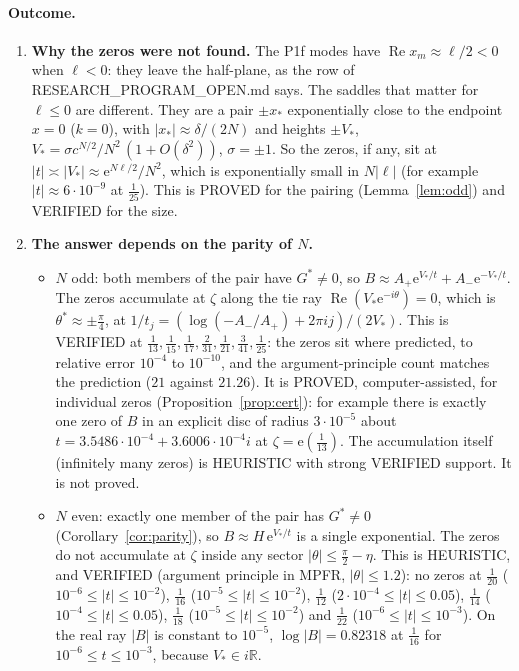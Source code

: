 \documentclass[11pt]{article}
\theoremstyle{remark}\newtheorem{remark}[theorem]{Remark}
\newcommand{\e}{\mathrm{e}}
\begin{document}
\paragraph{Outcome.}
\begin{enumerate}
\item[(A)] \textbf{Why the zeros were not found.} The P1f modes have $\operatorname{Re}x_m\approx\ell/2<0$ when $\ell<0$: they leave the
half-plane, as the row of RESEARCH\_PROGRAM\_OPEN.md says. The saddles that matter for $\ell\le0$ are different. They are
a pair $\pm x_*$ exponentially close to the endpoint $x=0$ ($k=0$), with $|x_*|\approx\delta/(2N)$ and heights
$\pm V_*$, $V_*=\sigma c^{N/2}/N^2\,(1+O(\delta^2))$, $\sigma=\pm1$. So the zeros, if any, sit at $|t|\asymp|V_*|\approx\e^{N\ell/2}/N^2$,
which is exponentially small in $N|\ell|$ (for example $|t|\approx6\cdot10^{-9}$ at $\frac1{25}$). This is PROVED for the pairing (Lemma~\ref{lem:odd})
and VERIFIED for the size.
\item[(B)] \textbf{The answer depends on the parity of $N$.}
\begin{itemize}
\item $N$ odd: both members of the pair have $G^*\ne0$, so $B\approx A_+\e^{V_*/t}+A_-\e^{-V_*/t}$. The zeros accumulate at $\zeta$ along
the tie ray $\operatorname{Re}(V_*\e^{-i\theta})=0$, which is $\theta^*\approx\pm\frac\pi4$, at $1/t_j=(\log(-A_-/A_+)+2\pi ij)/(2V_*)$.
This is VERIFIED at $\frac1{13},\frac1{15},\frac1{17},\frac2{31},\frac1{21},\frac3{41},\frac1{25}$: the zeros sit where predicted, to relative
error $10^{-4}$ to $10^{-10}$, and the argument-principle count matches the prediction ($21$ against $21.26$). It is PROVED,
computer-assisted, for individual zeros (Proposition~\ref{prop:cert}): for example there is exactly one zero of $B$ in an explicit disc
of radius $3\cdot10^{-5}$ about $t=3.5486\cdot10^{-4}+3.6006\cdot10^{-4}i$ at $\zeta=\e(\frac1{13})$. The accumulation itself
(infinitely many zeros) is HEURISTIC with strong VERIFIED support. It is not proved.
\item $N$ even: exactly one member of the pair has $G^*\ne0$ (Corollary~\ref{cor:parity}), so $B\approx H\,\e^{V_*/t}$ is a single exponential.
The zeros do not accumulate at $\zeta$ inside any sector $|\theta|\le\frac\pi2-\eta$. This is HEURISTIC, and VERIFIED
(argument principle in MPFR, $|\theta|\le1.2$): no zeros at $\frac1{20}$ ($10^{-6}\le|t|\le10^{-2}$), $\frac1{16}$ ($10^{-5}\le|t|\le10^{-2}$),
$\frac1{12}$ ($2\cdot10^{-4}\le|t|\le0.05$), $\frac1{14}$ ($10^{-4}\le|t|\le0.05$), $\frac1{18}$ ($10^{-5}\le|t|\le10^{-2}$) and $\frac1{22}$ ($10^{-6}\le|t|\le10^{-3}$). On the real ray $|B|$ is constant to $10^{-5}$, $\log|B|=0.82318$ at $\frac1{16}$ for $10^{-6}\le t\le10^{-3}$, because $V_*\in i\mathbb R$.

\end{itemize}
\end{enumerate}
\end{document}
